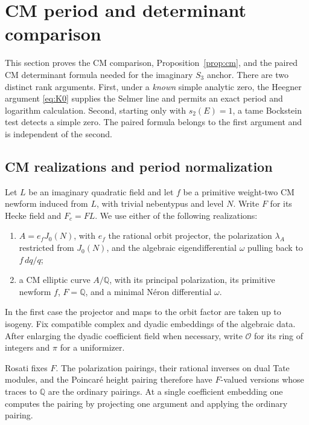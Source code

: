 \section{CM period and determinant comparison}\label{sec:cm}

This section proves the CM comparison, Proposition~\ref{prop:cm}, and the
paired CM determinant formula needed for the imaginary \(S_3\) anchor.
There are two distinct rank arguments. First, under a \emph{known} simple
analytic zero, the Heegner argument \eqref{eq:K0} supplies the Selmer line
and permits an exact period and logarithm calculation. Second, starting
only with \(s_2(E)=1\), a tame Bockstein test detects a simple zero.
The paired formula belongs to the first argument and is independent of
the second.

\subsection{CM realizations and period normalization}

Let \(L\) be an imaginary quadratic field and let \(f\) be a primitive
weight-two CM newform induced from \(L\), with trivial nebentypus and
level \(N\). Write \(F\) for its Hecke field and \(F_c=FL\).
We use either of the following realizations:
\begin{enumerate}[label=(\roman*)]
\item \(A=e_fJ_0(N)\), with \(e_f\) the rational orbit projector,
the polarization \(\lambda_A\) restricted from \(J_0(N)\), and the
algebraic eigendifferential \(\omega\) pulling back to \(f\,dq/q\);
\item a CM elliptic curve \(A/\mathbb Q\), with its principal
polarization, its primitive newform \(f\), \(F=\mathbb Q\), and a
minimal N\'eron differential \(\omega\).
\end{enumerate}
In the first case the projector and maps to the orbit factor are taken
up to isogeny. Fix compatible complex and dyadic embeddings of the
algebraic data. After enlarging the dyadic coefficient field when
necessary, write \(\mathcal O\) for its ring of integers and \(\pi\)
for a uniformizer.

Rosati fixes \(F\). The polarization pairings, their rational inverses
on dual Tate modules, and the Poincar\'e height pairing therefore have
\(F\)-valued versions whose traces to \(\mathbb Q\) are the ordinary
pairings. At a single coefficient embedding one computes the pairing
by projecting one argument and applying the ordinary pairing.

